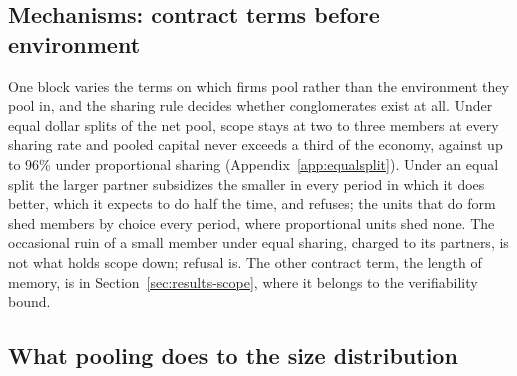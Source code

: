 

\subsection{Mechanisms: contract terms before environment}\label{sec:results-mechanisms}

One block varies the terms on which firms pool rather than the environment they pool in, and the sharing rule decides whether conglomerates exist at all. Under equal dollar splits of the net pool, scope stays at two to three members at every sharing rate and pooled capital never exceeds a third of the economy, against up to 96\% under proportional sharing (Appendix~\ref{app:equalsplit}). Under an equal split the larger partner subsidizes the smaller in every period in which it does better, which it expects to do half the time, and refuses; the units that do form shed members by choice every period, where proportional units shed none. The occasional ruin of a small member under equal sharing, charged to its partners, is not what holds scope down; refusal is. The other contract term, the length of memory, is in Section~\ref{sec:results-scope}, where it belongs to the verifiability bound.

\subsection{What pooling does to the size distribution}\label{sec:results-distribution}

